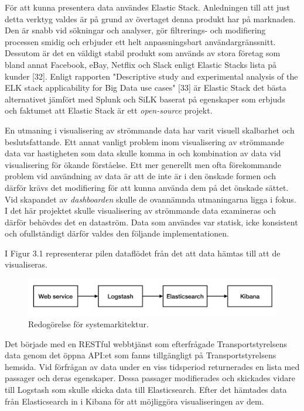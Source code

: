 \documentclass[12pt]{kththesis}
\begin{document}
För att kunna presentera data användes Elastic Stack. Anledningen till att just detta verktyg valdes är på grund av övertaget denna produkt har på marknaden. Den är snabb vid sökningar och analyser, gör filtrerings- och modifiering processen smidig och erbjuder ett helt anpassningsbart användargränssnitt. Dessutom är det en väldigt stabil produkt som används av stora företag som bland annat Facebook, eBay, Netflix och Slack enligt Elastic Stacks lista på kunder [32]. Enligt rapporten "Descriptive study and experimental analysis of the ELK stack applicability for Big Data use cases" [33] är Elastic Stack det bästa alternativet jämfört med Splunk och SiLK baserat på egenskaper som erbjuds och faktumet att Elastic Stack är ett \textit{open-source} projekt. 

En utmaning i visualisering av strömmande data har varit visuell skalbarhet och beslutsfattande. Ett annat vanligt problem inom visualisering av strömmande data var hastigheten som data skulle komma in och kombination av data vid visualisering för ökande förståelse. Ett mer generellt men ofta förekommande problem vid användning av data är att de inte är i den önskade formen och därför krävs det modifiering för att kunna använda dem på det önskade sättet. Vid skapandet av \textit{dashboarden} skulle de ovannämnda utmaningarna ligga i fokus. I det här projektet skulle visualisering av strömmande data examineras och därför behövdes det en dataström. Data som användes var statisk, icke konsistent och ofullständigt därför valdes den följande implementationen.

I Figur 3.1 representerar pilen dataflödet från det att data hämtas till att de visualiseras. 

\begin{figure}[h]
\centering
\includegraphics[width=1\textwidth]{Systemarkitektur}
\caption{Redogörelse för systemarkitektur.}
\end{figure}

Det började med en RESTful webbtjänst som efterfrågade Transportstyrelsens data genom det öppna API:et som fanns tillgängligt på Transportstyrelsens hemsida. Vid förfrågan av data under en viss tidsperiod returnerades en lista med passager och deras egenskaper. Dessa passager modifierades och skickades vidare till Logstash som skulle skicka data till Elasticsearch. Efter det hämtades data från Elasticsearch in i Kibana för att möjliggöra visualiseringen av dem.  
\end{document}
